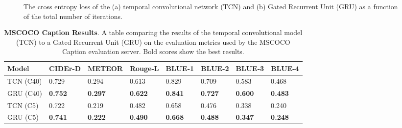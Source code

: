 \documentclass[a4paper, twoside]{article}
\begin{document}
\begin{figure}
    \centering
  	\caption{The cross entropy loss of the (a) temporal convolutional network (TCN) and (b) Gated Recurrent Unit (GRU) as a function of the total number of iterations.} \label{figtcntraingraph}
\end{figure}

\begin{table}
\begin{center}
    \begin{tabular}{| l | l | l | l | l | l| l | l  |}
    \hline
    Model & CIDEr-D & METEOR & Rouge-L & BLUE-1 & BLUE-2 & BLUE-3 & BLUE-4\\ \hline \hline
    TCN (C40) & 0.729 & 0.294 & 0.613 & 0.829 & 0.709 & 0.583 & 0.468 \\ \hline
   	GRU (C40) & \textbf{0.752} & \textbf{0.297}& \textbf{0.622}& \textbf{0.841}& \textbf{0.727}& \textbf{0.600}& \textbf{0.483}\\ \hline \hline
    TCN (C5) & 0.722 & 0.219& 0.482& 0.658& 0.476& 0.338& 0.240\\ \hline
    GRU (C5) & \textbf{0.741} & \textbf{0.222}& \textbf{0.490}& \textbf{0.668}& \textbf{0.488}& \textbf{0.347}& \textbf{0.248}\\ \hline
    \end{tabular}
    \caption{\textbf{MSCOCO Caption Results}. A table comparing the results of the temporal convolutional model (TCN) to a Gated Recurrent Unit (GRU) on the evaluation metrics used by the MSCOCO Caption evaluation server. Bold scores show the best results.} \label{tabimagecaptioning}
\end{center}
\end{table}
\end{document}
